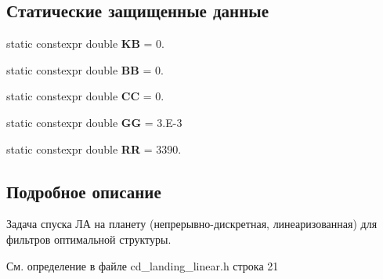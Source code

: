 \subsection*{Статические защищенные данные}
\begin{DoxyCompactItemize}
\item 
\hypertarget{class_tasks_1_1_continuous_discrete_1_1_landing_linear_a475a823bed7fe3574009ed1c1308cafe}{}\label{class_tasks_1_1_continuous_discrete_1_1_landing_linear_a475a823bed7fe3574009ed1c1308cafe} 
static constexpr double {\bfseries KB} = 0.
\item 
\hypertarget{class_tasks_1_1_continuous_discrete_1_1_landing_linear_ae874fa8bea9b4af9cdbabf3e69ef09f5}{}\label{class_tasks_1_1_continuous_discrete_1_1_landing_linear_ae874fa8bea9b4af9cdbabf3e69ef09f5} 
static constexpr double {\bfseries BB} = 0.
\item 
\hypertarget{class_tasks_1_1_continuous_discrete_1_1_landing_linear_ae4c050a50e6c6a62faf559c887f1d78e}{}\label{class_tasks_1_1_continuous_discrete_1_1_landing_linear_ae4c050a50e6c6a62faf559c887f1d78e} 
static constexpr double {\bfseries CC} = 0.
\item 
\hypertarget{class_tasks_1_1_continuous_discrete_1_1_landing_linear_ab0db010f0473b66dff76da034fc9d690}{}\label{class_tasks_1_1_continuous_discrete_1_1_landing_linear_ab0db010f0473b66dff76da034fc9d690} 
static constexpr double {\bfseries GG} = 3.\+E-\/3
\item 
\hypertarget{class_tasks_1_1_continuous_discrete_1_1_landing_linear_a623317fbb8c161c556d5557b4fb91832}{}\label{class_tasks_1_1_continuous_discrete_1_1_landing_linear_a623317fbb8c161c556d5557b4fb91832} 
static constexpr double {\bfseries RR} = 3390.
\end{DoxyCompactItemize}


\subsection{Подробное описание}
Задача спуска ЛА на планету (непрерывно-\/дискретная, линеаризованная) для фильтров оптимальной структуры. 

См. определение в файле cd\+\_\+landing\+\_\+linear.\+h строка 21



